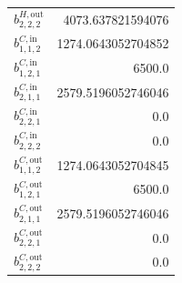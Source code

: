 \documentclass{article}%
\begin{document}
\begin{multicols*}{3}
\begin{supertabular}{lr}
	$b_{2,2,2}^{H,\text{out}}$ & 4073.637821594076 \\%
	$b_{1,1,2}^{C,\text{in}}$ & 1274.0643052704852 \\%
	$b_{1,2,1}^{C,\text{in}}$ & 6500.0 \\%
	$b_{2,1,1}^{C,\text{in}}$ & 2579.5196052746046 \\%
	$b_{2,2,1}^{C,\text{in}}$ & 0.0 \\%
	$b_{2,2,2}^{C,\text{in}}$ & 0.0 \\%
	$b_{1,1,2}^{C,\text{out}}$ & 1274.0643052704845 \\%
	$b_{1,2,1}^{C,\text{out}}$ & 6500.0 \\%
	$b_{2,1,1}^{C,\text{out}}$ & 2579.5196052746046 \\%
	$b_{2,2,1}^{C,\text{out}}$ & 0.0 \\%
	$b_{2,2,2}^{C,\text{out}}$ & 0.0 \\%
\end{supertabular}%
\end{multicols*}%
\end{document}
